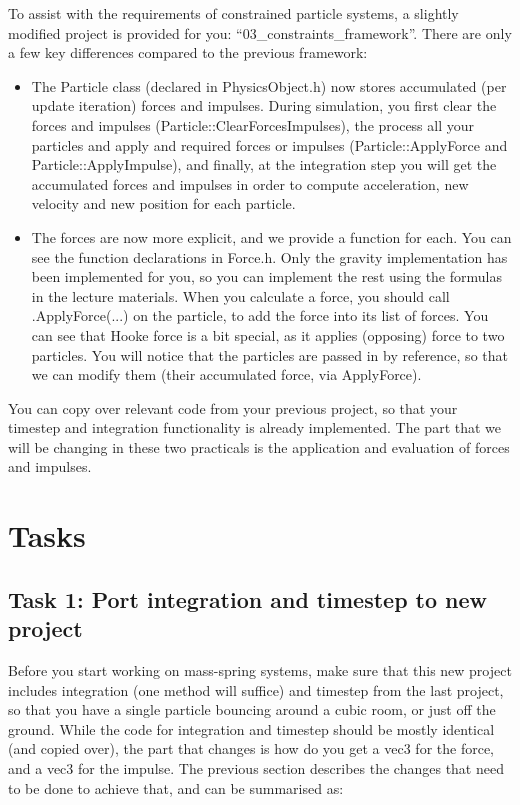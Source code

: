\documentclass[12pt]{article}
\begin{document}
To assist with the requirements of constrained particle systems, a slightly modified project is provided for you: ``03\_constraints\_framework''. There are only a few key differences compared to the previous framework:

\begin{itemize}
\item The Particle class (declared in PhysicsObject.h) now stores accumulated (per update iteration) forces and impulses. During simulation, you first clear the forces and impulses (Particle::ClearForcesImpulses), the process all your particles and apply and required forces or impulses (Particle::ApplyForce and Particle::ApplyImpulse), and finally, at the integration step you will get the accumulated forces and impulses in order to compute acceleration, new velocity and new position for each particle.
\item The forces are now more explicit, and we provide a function for each. You can see the function declarations in Force.h. Only the gravity implementation has been implemented for you, so you can implement the rest using the formulas in the lecture materials. When you calculate a force, you should call .ApplyForce(...) on the particle, to add the force into its list of forces. You can see that Hooke force is a bit special, as it applies (opposing) force to two particles. You will notice that the particles are passed in by reference, so that we can modify them (their accumulated force, via ApplyForce).
\end{itemize}

You can copy over relevant code from your previous project, so that your timestep and integration functionality is already implemented. The part that we will be changing in these two practicals is the application and evaluation of forces and impulses.

\section*{Tasks}

\subsection*{Task 1: Port integration and timestep to new project}

Before you start working on mass-spring systems, make sure that this new project includes integration (one method will suffice) and timestep from the last project, so that you have a single particle bouncing around a cubic room, or just off the ground. While the code for integration and timestep should be mostly identical (and copied over), the part that changes is how do you get a vec3 for the force, and a vec3 for the impulse. The previous section describes the changes that need to be done to achieve that, and can be summarised as:
\end{document}
